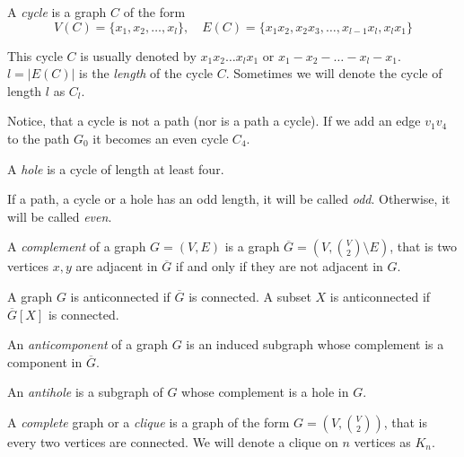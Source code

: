 \begin{defn}[cycle]
  A \emph{cycle} is a graph $C$ of the form
  \[ V(C) = \{x_1, x_2, \ldots, x_l\},\quad E(C) = \{x_1x_2, x_2x_3, \ldots, x_{l-1}x_l, x_lx_1\} \]
\end{defn}

This cycle $C$ is usually denoted by $x_1x_2\ldots x_lx_1$ or $x_1 - x_2 - \ldots - x_l - x_1$. $l = |E(C)|$ is the \emph{length} of the cycle $C$. Sometimes we will denote the cycle of length $l$ as $C_l$.

Notice, that a cycle is not a path (nor is a path a cycle). If we add an edge $v_1v_4$ to the path $G_0$ it becomes an even cycle $C_4$.

\begin{defn}[hole]
  A \emph{hole} is a cycle of length at least four.
\end{defn}

If a path, a cycle or a hole has an odd length, it will be called \emph{odd}. Otherwise, it will be called \emph{even}.

\begin{defn}[complement]
  A \emph{complement} of a graph $G = (V, E)$ is a graph $\overline{G} = (V, {V \choose 2} \setminus E)$, that is two vertices $x, y$ are adjacent in $\overline{G}$ if and only if they are not adjacent in $G$.
\end{defn}


\begin{defn}
  A graph $G$ is anticonnected if $\overline{G}$ is connected.
  A subset $X$ is anticonnected if $\overline{G}[X]$ is connected.
\end{defn}

\begin{defn}[anticomponent]
  An \emph{anticomponent} of a graph $G$ is an induced subgraph whose complement is a component in $\overline{G}$.
\end{defn}

\begin{defn}[antihole]
  An \emph{antihole} is a subgraph of $G$ whose complement is a hole in $G$.
\end{defn}

\begin{defn}[clique]
  A \emph{complete} graph or a \emph{clique} is a graph of the form $G = (V, {V \choose 2})$, that is every two vertices are connected. We will denote a clique on $n$ vertices as $K_n$.
\end{defn}

